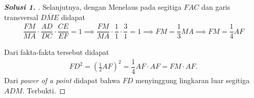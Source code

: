 \documentclass[letterpaper, 13pt]{scrartcl}
\begin{document}
\begin{proof}[\textbf{Solusi 1. }]
    Selanjutnya, dengan Menelaus pada segitiga $FAC$ dan garis transversal $\overline{DME}$ didapat
    \begin{align*}
        \dfrac{FM}{MA} \cdot \dfrac{AD}{DC} \cdot \dfrac{CE}{EF} = 1 \implies \dfrac{FM}{MA} \cdot \dfrac{1}{1} \cdot \dfrac{3}{1} = 1 \implies FM = \dfrac{1}{3} MA \implies FM = \dfrac{1}{4} AF
    \end{align*}

    Dari fakta-fakta tersebut didapat
    \begin{align*}
        FD^2 = \left(\frac{1}{2}AF\right)^2 = \dfrac{1}{4} AF \cdot AF = FM \cdot AF.
    \end{align*}
    Dari \textit{power of a point} didapat bahwa $FD$ menyinggung lingkaran luar segitiga $ADM$. Terbukti.
\end{proof}
\end{document}
